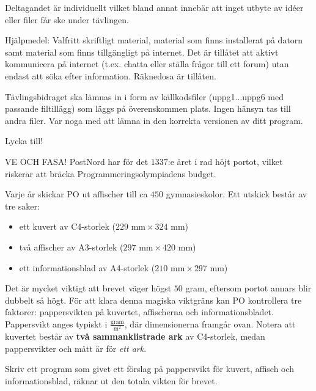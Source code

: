 \begin{lista}
\item Deltagandet är individuellt vilket bland annat innebär att inget utbyte av idéer eller 
filer får ske under tävlingen.  
\item Hjälpmedel: Valfritt skriftligt material, material som finns installerat på datorn samt material som finns tillgängligt på internet. Det är  tillåtet att aktivt kommunicera på internet (t.ex. chatta eller ställa frågor till ett forum) utan endast att söka efter information. Räknedosa är tillåten.
\item Tävlingsbidraget ska lämnas in i form av källkodsfiler (uppg1...uppg6 med passande filtillägg) som läggs på överenskommen plats. Ingen hänsyn tas till andra filer. Var noga 
med att lämna in den korrekta versionen av ditt program.  
\end{lista}

\begin{center}
\Large Lycka till!
\end{center}
%

\newpage
{}

VE OCH FASA!
PostNord har för det $1337$:e året i rad höjt portot, vilket riskerar att bräcka Programmeringsolympiadens budget.

Varje år skickar PO ut affischer till ca $450$ gymnasieskolor. Ett utskick består av tre saker: 
\begin{itemize}
\item ett kuvert av C4-storlek ($229\text{ mm} \times 324\text{ mm}$)
\item två affischer av A3-storlek ($297\text{ mm} \times 420\text{ mm}$)
\item ett informationsblad av A4-storlek ($210\text{ mm} \times 297\text{ mm}$)
\end{itemize}

Det är mycket viktigt att brevet väger högst $50$ gram, eftersom portot annars blir dubbelt så högt. För att klara denna magiska viktgräns kan PO kontrollera tre faktorer: pappersvikten på kuvertet, affischerna och informationsbladet. Pappersvikt anges typiskt i $\frac{\text{gram}}{\text{m}^2}$, där dimensionerna framgår ovan. Notera att kuvertet består av \textbf{två sammanklistrade ark} av C4-storlek, medan pappersvikter och mått är för \emph{ett ark}.

Skriv ett program som givet ett förslag på pappersvikt för kuvert, affisch och informationsblad, räknar ut den totala vikten för brevet.

